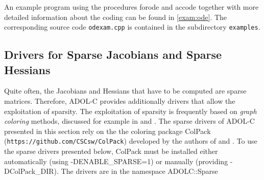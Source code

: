 \documentclass[11pt,twoside]{article}
\begin{document}
An example program using the procedures {\sf forode} and {\sf accode} together
with more detailed information about the coding can be found in
\autoref{exam:ode}. The corresponding source code 
\verb=odexam.cpp= is contained in the subdirectory
\verb=examples=.
%
%
\subsection{Drivers for Sparse Jacobians and Sparse Hessians}
\label{sparse}
%
Quite often, the Jacobians and Hessians that have to be computed are sparse
matrices. Therefore, ADOL-C provides additionally drivers that 
allow the exploitation of sparsity. The exploitation of sparsity is
frequently based on {\em graph coloring} methods, discussed 
for example in \cite{GeMaPo05} and \cite{GeTaMaPo07}. The sparse drivers of ADOL-C presented in this section
rely on the the coloring package ColPack (\verb=https://github.com/CSCsw/ColPack=) developed by the authors of \cite{GeMaPo05} and \cite{GeTaMaPo07}.
To use the sparse drivers presented below, ColPack must be installed either automatically (using {\sf -DENABLE\_SPARSE=1})
 or manually (providing {\sf -DColPack\_DIR}). The drivers are in the namespace {\sf ADOLC::Sparse}
%
\end{document}
